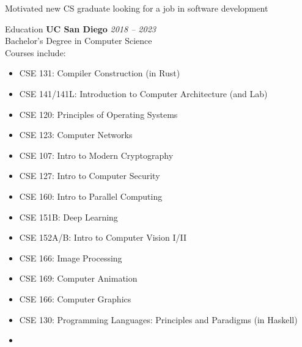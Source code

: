 


	\begin{center}
	Motivated new CS graduate looking for a job in {software development}
	\end{center}

	\begin{rSection}{Education}
		{\bf UC San Diego} \hfill {\em 2018 -- 2023} 
		\\ Bachelor's Degree in Computer Science %
		\\ Courses include:
		\begin{multicols}{2}
			\begin{itemize}
				\item CSE 131: Compiler Construction (in Rust)
				\item CSE 141/141L: Introduction to Computer Architecture (and Lab)
				\item CSE 120: Principles of Operating Systems
				\item CSE 123: Computer Networks
				\item CSE 107: Intro to Modern Cryptography
				\item CSE 127: Intro to Computer Security
				\item CSE 160: Intro to Parallel Computing
				\item CSE 151B: Deep Learning
				\item CSE 152A/B: Intro to Computer Vision I/II
				\item CSE 166: Image Processing
				\item CSE 169: Computer Animation
				\item CSE 166: Computer Graphics
				\item CSE 130: Programming Languages: Principles and Paradigms (in Haskell)
				\item[\vspace{\fill}] %
			\end{itemize}
		\end{multicols}

	\end{rSection}
	

